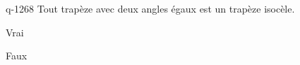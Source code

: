 \begin{truefalse}{q-1268}
Tout trapèze avec deux angles égaux est un trapèze isocèle.
\item Vrai
\item* Faux
\end{truefalse}

